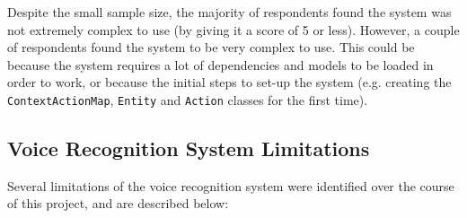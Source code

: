 \documentclass[11pt]{article}
\begin{document}
Despite the small sample size, the majority of respondents found the system was not extremely complex to use (by giving it a score of 5 or less). However, a couple of respondents found the system to be very complex to use. This could be because the system requires a lot of dependencies and models to be loaded in order to work, or because the initial steps to set-up the system (e.g. creating the \texttt{ContextActionMap}, \texttt{Entity} and \texttt{Action} classes for the first time).

\subsection{Voice Recognition System Limitations}

Several limitations of the voice recognition system were identified over the course of this project, and are described below:
\end{document}
